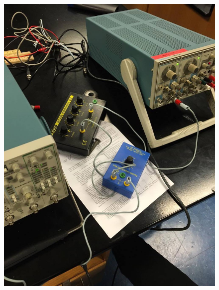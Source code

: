 \documentclass[11pt, titlepage]{article}
\begin{document}
\begin{figure}[h]
\centering
\hspace*{0cm}
\includegraphics[scale=0.4]{lab51.jpg}
\vspace*{0cm}
\end{figure}
\end{document}
